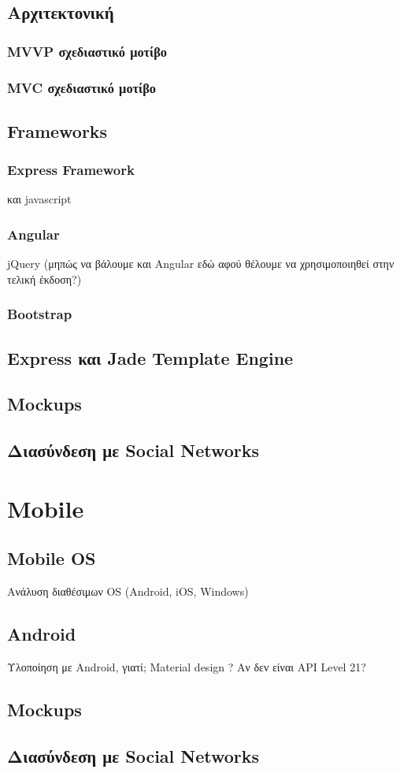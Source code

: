 	\subsection{Αρχιτεκτονική}
		\subsubsection{MVVP σχεδιαστικό μοτίβο}
		\subsubsection{MVC σχεδιαστικό μοτίβο}
	\subsection{Frameworks}
		\subsubsection{Express Framework}
			και javascript
		\subsubsection{Angular}
			jQuery (μηπώς να βάλουμε και Angular εδώ αφού θέλουμε να
χρησιμοποιηθεί στην τελική έκδοση?)
		\subsubsection{Bootstrap}
	\subsection{Express και Jade Template Engine}
	\subsection{Mockups}
	\subsection{Διασύνδεση με Social Networks}

\section{Mobile}
	\subsection{Mobile OS}
		Ανάλυση διαθέσιμων OS (Android, iOS, Windows)
	\subsection{Android}
		Υλοποίηση με Android, γιατί;
		Material design ? Αν δεν είναι API Level 21?
	\subsection{Mockups}
	\subsection{Διασύνδεση με Social Networks}
